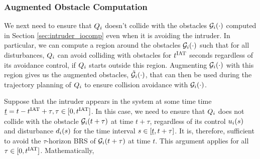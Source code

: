 %
%

\subsubsection{Augmented Obstacle Computation} \label{sec:intruder_aocomp}
We next need to ensure that $Q_i$ doesn't collide with the obstacles $\mathcal{G}_i(\cdot)$ computed in Section \ref{sec:intruder_iocomp} even when it is avoiding the intruder. In particular, we can compute a region around the obstacles $\mathcal{G}_i(\cdot)$ such that for all disturbances, $Q_i$ can avoid colliding with obstacles for $t^\text{IAT}$ seconds regardless of its avoidance control, if $Q_i$ starts outside this region. Augmenting $\mathcal{G}_i(\cdot)$ with this region gives us the augmented obstacles, $\tilde{\mathcal{G}}_i(\cdot)$, that can then be used during the trajectory planning of $Q_i$ to ensure collision avoidance with $\mathcal{G}_i(\cdot)$.  

Suppose that the intruder appears in the system at some time time $\underline{t} = t - t^\text{IAT} + \tau, \tau \in [0, t^\text{IAT}]$. In this case, we need to ensure that $Q_i$ does not collide with the obstacle $\mathcal{G}_i(t + \tau)$ at time $t + \tau$, regardless of its control $u_i(s)$ and disturbance $d_i(s)$ for the time interval $s \in [\underline{t}, t + \tau]$. It is, therefore, sufficient to avoid the $\tau$-horizon BRS of $\mathcal{G}_i(t + \tau)$ at time $t$. This argument applies for all $\tau \in [0, t^\text{IAT}]$. Mathematically,

